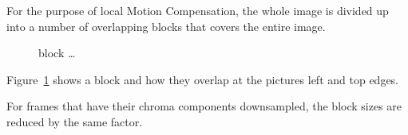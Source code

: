 For the purpose of local Motion Compensation, the whole image is divided
up into a number of overlapping blocks that covers the entire image.

\begin{figure}
    \centering
    \hspace{0.5in}
   \caption{block \ldots}
   \label{fig:blocks}
\end{figure}

Figure~\ref{fig:blocks} shows a block and how they overlap at the
pictures left and top edges.

For frames that have their chroma components downsampled, the block
sizes are reduced by the same factor.

